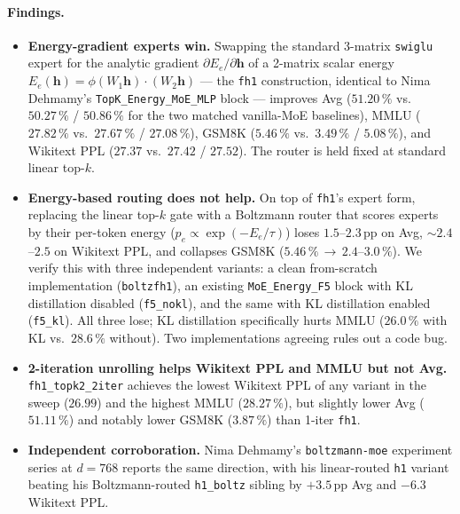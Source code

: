 \documentclass[oneside]{article}
\begin{document}
\paragraph{Findings.}
\begin{itemize}[leftmargin=1.5em]
  \item \textbf{Energy-gradient experts win.} Swapping the standard
        3-matrix \texttt{swiglu} expert for the analytic gradient
        $\partial E_e/\partial \mathbf{h}$ of a 2-matrix scalar energy
        $E_e(\mathbf{h})=\phi(W_1 \mathbf{h})\!\cdot\!(W_2 \mathbf{h})$
        --- the \texttt{fh1} construction, identical to Nima Dehmamy's
        \texttt{TopK\_Energy\_MoE\_MLP} block --- improves Avg
        ($51.20\,\%$ vs.\ $50.27\,\%$ / $50.86\,\%$ for the two matched
        vanilla-MoE baselines), MMLU ($27.82\,\%$ vs.\ $27.67\,\%$ /
        $27.08\,\%$), GSM8K ($5.46\,\%$ vs.\ $3.49\,\%$ / $5.08\,\%$),
        and Wikitext PPL ($27.37$ vs.\ $27.42$ / $27.52$). The router is
        held fixed at standard linear top-$k$.
  \item \textbf{Energy-based routing does not help.} On top of
        \texttt{fh1}'s expert form, replacing the linear top-$k$ gate
        with a Boltzmann router that scores experts by their per-token
        energy ($p_e\propto \exp(-E_e/\tau)$) loses $1.5$--$2.3$\,pp on
        Avg, $\sim$$2.4$--$2.5$ on Wikitext PPL, and collapses GSM8K
        ($5.46\,\%$\,$\to$\,$2.4$--$3.0\,\%$). We verify this with three
        independent variants: a clean from-scratch implementation
        (\texttt{boltzfh1}), an existing \texttt{MoE\_Energy\_F5} block
        with KL distillation disabled (\texttt{f5\_nokl}), and the same
        with KL distillation enabled (\texttt{f5\_kl}). All three lose;
        KL distillation specifically hurts MMLU ($26.0\,\%$ with KL vs.\
        $28.6\,\%$ without). Two implementations agreeing rules out a
        code bug.
  \item \textbf{2-iteration unrolling helps Wikitext PPL and MMLU but
        not Avg.} \texttt{fh1\_topk2\_2iter} achieves the lowest
        Wikitext PPL of any variant in the sweep ($26.99$) and the
        highest MMLU ($28.27\,\%$), but slightly lower Avg
        ($51.11\,\%$) and notably lower GSM8K ($3.87\,\%$) than
        1-iter \texttt{fh1}.
  \item \textbf{Independent corroboration.} Nima Dehmamy's
        \texttt{boltzmann-moe} experiment series at $d{=}768$ reports
        the same direction, with his linear-routed \texttt{h1} variant
        beating his Boltzmann-routed \texttt{h1\_boltz} sibling by
        $+3.5$\,pp Avg and $-6.3$ Wikitext PPL.
\end{itemize}
\end{document}
